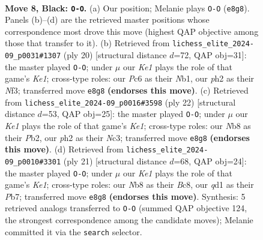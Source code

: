 \documentclass[11pt]{article}
\begin{document}
\begin{figure}[p]\centering
\begin{subfigure}{0.46\textwidth}\centering
\resizebox{\linewidth}{!}{%
\newchessgame
\chessboard[
  setfen={rnbqk2r/pp4pp/2pbpn2/5p2/2PP4/5NP1/P3PPBP/RNBQ1RK1 b kq - 0 8},
  showmover=false,
  pgfstyle=straightmove, color=movearrow, markmove={e8-g8}
]}
\caption{}
\end{subfigure}\hfill
\begin{subfigure}{0.46\textwidth}\centering
\resizebox{\linewidth}{!}{%
\newchessgame
\chessboard[
  setfen={r1bq1rk1/ppp2ppp/3b1n2/3p4/3P4/2PBPN2/P4PPP/RN1QK2R w KQ - 2 11},
  showmover=false,
  pgfstyle=straightmove, color=movearrow, markmove={e1-g1}
]}
\caption{}
\end{subfigure}
\\[4pt]
\begin{subfigure}{0.46\textwidth}\centering
\resizebox{\linewidth}{!}{%
\newchessgame
\chessboard[
  setfen={rnbq1rk1/1p3ppp/p2b1n2/2pP4/2P5/P1NB1N2/1P4PP/R1BQK2R w KQ - 2 12},
  showmover=false,
  pgfstyle=straightmove, color=movearrow, markmove={e1-g1}
]}
\caption{}
\end{subfigure}\hfill
\begin{subfigure}{0.46\textwidth}\centering
\resizebox{\linewidth}{!}{%
\newchessgame
\chessboard[
  setfen={r1b1k2r/1pq1bppp/p1n1pn2/8/2P5/P1N2NP1/1P3PBP/R1BQ1RK1 b kq - 4 11},
  showmover=false,
  pgfstyle=straightmove, color=movearrow, markmove={e8-g8}
]}
\caption{}
\end{subfigure}
\caption{\textbf{Move 8, Black: \texttt{O-O}.} (a) Our position; Melanie plays \texttt{O-O} (\texttt{e8g8}). Panels (b)--(d) are the retrieved master positions whose correspondence most drove this move (highest QAP objective among those that transfer to it). (b) Retrieved from \texttt{lichess\_elite\_2024-09\_p0031\#1307} (ply 20) [structural distance $d$=72, QAP obj=31]: the master played \texttt{O-O}; under $\mu$ our \emph{Ke1} plays the role of that game's \emph{Ke1}; cross-type roles: our \emph{P}c6 as their \emph{N}b1, our \emph{p}h2 as their \emph{N}f3; transferred move \texttt{e8g8} \textbf{(endorses this move)}. (c) Retrieved from \texttt{lichess\_elite\_2024-09\_p0016\#3598} (ply 22) [structural distance $d$=53, QAP obj=25]: the master played \texttt{O-O}; under $\mu$ our \emph{Ke1} plays the role of that game's \emph{Ke1}; cross-type roles: our \emph{N}b8 as their \emph{P}b2, our \emph{p}h2 as their \emph{N}c3; transferred move \texttt{e8g8} \textbf{(endorses this move)}. (d) Retrieved from \texttt{lichess\_elite\_2024-09\_p0010\#3301} (ply 21) [structural distance $d$=68, QAP obj=24]: the master played \texttt{O-O}; under $\mu$ our \emph{Ke1} plays the role of that game's \emph{Ke1}; cross-type roles: our \emph{N}b8 as their \emph{B}c8, our \emph{q}d1 as their \emph{P}b7; transferred move \texttt{e8g8} \textbf{(endorses this move)}. Synthesis: 5 retrieved analogs transferred to \texttt{O-O} (summed QAP objective 124, the strongest correspondence among the candidate moves); Melanie committed it via the \texttt{search} selector.}
\label{fig:thought-m15}
\end{figure}
\end{document}
